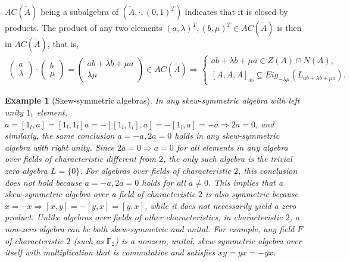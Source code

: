 \documentclass[12pt]{article}
\newtheorem{example}[theorem]{Example}
\begin{document}
		$AC(\tilde{A})$ being a subalgebra of $(\tilde{A},\cdot, (0,1)^T)$ indicates that it is closed by products. The product of any two elements $(a,\lambda)^T,(b,\mu)^T\in AC(\tilde{A})$ is then in $AC(\tilde{A})$, that is,
		\begin{align*}
			\begin{pmatrix}
				a \\ \lambda
			\end{pmatrix}\cdot \begin{pmatrix}
				b \\ \mu
			\end{pmatrix}=\begin{pmatrix}
				ab+\lambda b+\mu a \\ \lambda\mu
			\end{pmatrix}\in AC(\tilde{A})\Rightarrow \left\{\begin{array}{c}
				ab+\lambda b+\mu a\in Z(A)\cap N(A), \\
				\left[A,A,A\right]_{\mathrm{as}}\subseteq Eig_{-\lambda\mu}(L_{ab+\lambda b+\mu a}).
			\end{array} \right.
		\end{align*}
		
		
		
			 \begin{example}[Skew-symmetric algebras]\label{ex:skewsym}
           In any skew-sym\-metric algebra with left unity $1_1$ element, $a=[1_l,a]=[1_l,1_l]a=-[[1_l,1_l],a]=-[1_l,a]=-a\Rightarrow 2a=0$, and similarly, the same conclusion $a=-a, 2a=0 $ holds in any skew-sym\-metric algebra with right unity.
            Since $2a=0\Rightarrow a=0$ for all elements in any algebra over fields of characteristic different from $2$, the only such algebra is the trivial zero algebra $L=\{0\}$. For algebras over fields of characteristic $2$, this conclusion does not hold because $a=-a, 2a=0$ holds for all $a\neq 0$.
            This implies that a skew-symmetric algebra over a field of characteristic $2$ is  also symmetric because $x=-x \Rightarrow [x,y]=-[y,x]=[y,x]$, while it does not necessarily yield a zero product.
            Unlike algebras over fields of other characteristics, in characteristic $2$, a non-zero algebra can be both skew-symmetric and unital. For example, any field $F$ of characteristic $2$ (such as $\mathbb{F}_{2}$) is a nonzero, unital, skew-symmetric algebra over itself with multiplication that is commutative and satisfies $xy=yx=-yx$.
            \end{example}
\end{document}
